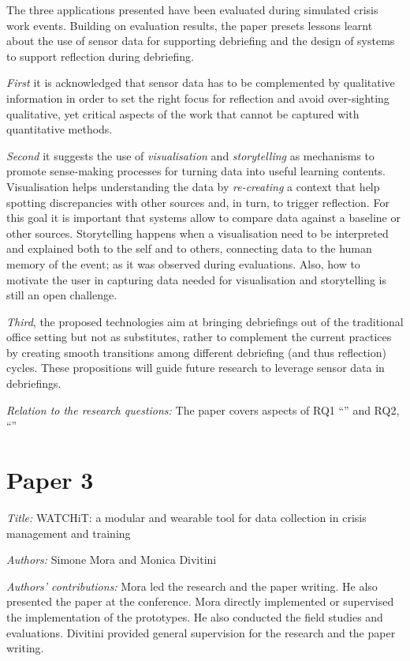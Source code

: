 The three applications presented have been evaluated during simulated crisis work events. Building on evaluation results, the paper presets lessons learnt about the use of sensor data for supporting debriefing and the design of systems to support reflection during debriefing. 

\emph{First} it is acknowledged that sensor data has to be complemented by qualitative information in order to set the right focus for reflection and avoid over-sighting qualitative, yet critical aspects of the work that cannot be captured with quantitative methods.

\emph{Second} it suggests the use of \emph{visualisation} and \emph{storytelling} as mechanisms to promote sense-making processes for turning data into useful learning contents. Visualisation helps understanding the data by \emph{re-creating} a context that help spotting discrepancies with other sources and, in turn, to trigger reflection. For this goal it is important that systems allow to compare data against a baseline or other sources. Storytelling happens when a visualisation need to be interpreted and explained both to the self and to others, connecting data to the human memory of the event; as it was observed during evaluations. Also, how to motivate the user in capturing data needed for visualisation and storytelling is still an open challenge.

\emph{Third}, the proposed technologies aim at bringing debriefings out of the traditional office setting but not as substitutes, rather to complement the current practices by creating smooth transitions among different debriefing (and thus reflection) cycles. These propositions will guide future research to leverage sensor data in debriefings.

\emph{Relation to the research questions:} The paper covers aspects of RQ1 ``\RQi'' and RQ2, ``\RQi''

\section[WATCHiT: a modular and wearable tool for data collection in crisis management and training]{Paper 3}\label{paper-3}

\emph{Title:} WATCHiT: a modular and wearable tool for data collection in crisis management and training

\emph{Authors:} Simone Mora and Monica Divitini

\emph{Authors' contributions:} Mora led the research and the paper writing. He also presented the paper at the conference. Mora directly implemented or supervised the implementation of the prototypes. He also conducted the field studies and evaluations. Divitini provided general supervision for the research and the paper writing.


